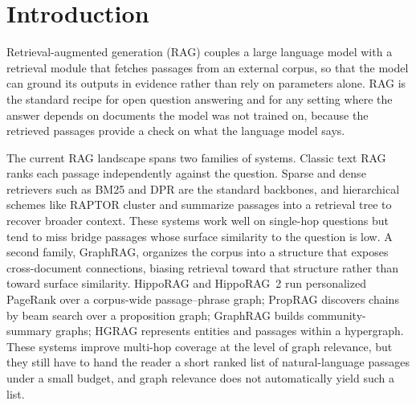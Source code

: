 %
%

\section{Introduction}
\label{sec:intro}

Retrieval-augmented generation (RAG) couples a large language model
with a retrieval module that fetches passages from an external
corpus, so that the model can ground its outputs in evidence rather
than rely on parameters alone. RAG is the standard recipe for open
question answering and for any setting where the answer depends on
documents the model was not trained on, because the retrieved
passages provide a check on what the language model says.

The current RAG landscape spans two families of systems. Classic
text RAG ranks each passage independently against the question.
Sparse and dense retrievers such as BM25
\citep{robertson2009bm25} and DPR \citep{karpukhin2020dpr} are the
standard backbones, and hierarchical schemes like RAPTOR
\citep{sarthi2024raptor} cluster and summarize passages into a
retrieval tree to recover broader context. These systems work well
on single-hop questions but tend to miss bridge passages whose
surface similarity to the question is low. A second family,
GraphRAG, organizes the corpus into a structure that exposes
cross-document connections, biasing retrieval toward that structure
rather than toward surface similarity. HippoRAG and HippoRAG~2
\citep{jimenez2024hipporag,gutierrez2025hipporag} run personalized
PageRank over a corpus-wide passage--phrase graph; PropRAG
\citep{wang2025proprag} discovers chains by beam search over a
proposition graph; GraphRAG \citep{edge2024graphrag} builds
community-summary graphs; HGRAG \citep{hgrag2024} represents
entities and passages within a hypergraph. These systems improve
multi-hop coverage at the level of graph relevance, but they still
have to hand the reader a short ranked list of natural-language
passages under a small budget, and graph relevance does not
automatically yield such a list.

